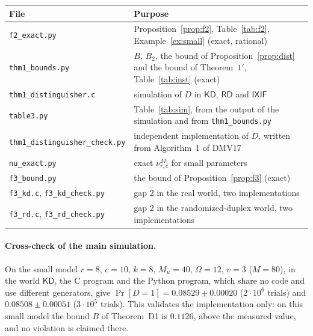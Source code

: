 \documentclass[11pt,a4paper]{article}
\theoremstyle{definition}
\theoremstyle{remark}
\newcommand{\KD}{\mathsf{KD}}
\newcommand{\RD}{\mathsf{RD}}
\newcommand{\IXIF}{\mathsf{IXIF}}
\newcommand{\file}[1]{\texttt{#1}}
\begin{document}
\begin{center}
\small\begin{tabular}{lp{9.6cm}}
\toprule
File & Purpose \\
\midrule
\file{f2\_exact.py} & Proposition~\ref{prop:f2}, Table~\ref{tab:f2}, Example~\ref{ex:small} (exact, rational) \\
\file{thm1\_bounds.py} & $B$, $B_2$, the bound of Proposition~\ref{prop:dist} and the bound of Theorem~$1'$, Table~\ref{tab:inst} (exact) \\
\file{thm1\_distinguisher.c} & simulation of $D$ in $\KD$, $\RD$ and $\IXIF$ \\
\file{table3.py} & Table~\ref{tab:sim}, from the output of the simulation and from \file{thm1\_bounds.py} \\
\file{thm1\_distinguisher\_check.py} & independent implementation of $D$, written from Algorithm~1 of DMV17 \\
\file{nu\_exact.py} & exact $\nu^M_{r,c}$ for small parameters \\
\file{f3\_bound.py} & the bound of Proposition~\ref{prop:f3} (exact) \\
\file{f3\_kd.c}, \file{f3\_kd\_check.py} & gap 2 in the real world, two implementations \\
\file{f3\_rd.c}, \file{f3\_rd\_check.py} & gap 2 in the randomized-duplex world, two implementations \\
\bottomrule
\end{tabular}
\end{center}

\paragraph{Cross-check of the main simulation.} On the small model $r = 8$, $c = 10$, $k = 8$, $M_u = 40$, $\Omega = 12$, $v = 3$
($M = 80$), in the world $\KD$, the C program and the Python program, which share no code and use different generators,
give $\Pr[D = 1] = 0.08529 \pm 0.00020$ ($2 \cdot 10^6$ trials) and $0.08508 \pm 0.00051$ ($3 \cdot 10^5$ trials). This validates the
implementation only: on this small model the bound $B$ of Theorem~D1 is $0.1126$, above the measured value, and no
violation is claimed there.
\end{document}
